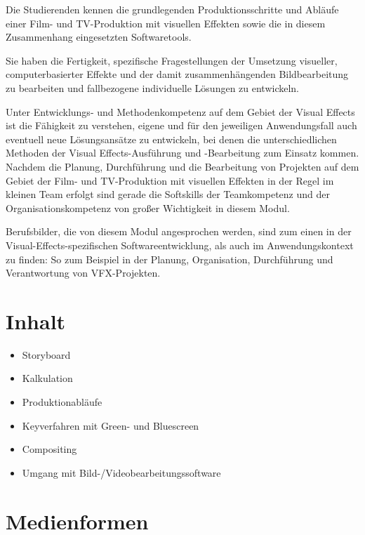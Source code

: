 Die Studierenden kennen die grundlegenden Produktionsschritte und
Abläufe einer Film- und TV-Produktion mit visuellen Effekten sowie die
in diesem Zusammenhang eingesetzten Softwaretools.

Sie haben die Fertigkeit, spezifische Fragestellungen der Umsetzung
visueller, computerbasierter Effekte und der damit zusammenhängenden
Bildbearbeitung zu bearbeiten und fallbezogene individuelle Lösungen zu
entwickeln.

Unter Entwicklungs- und Methodenkompetenz auf dem Gebiet der Visual
Effects ist die Fähigkeit zu verstehen, eigene und für den jeweiligen
Anwendungsfall auch eventuell neue Lösungsansätze zu entwickeln, bei
denen die unterschiedlichen Methoden der Visual Effects-Ausführung und
-Bearbeitung zum Einsatz kommen. Nachdem die Planung, Durchführung und
die Bearbeitung von Projekten auf dem Gebiet der Film- und TV-Produktion
mit visuellen Effekten in der Regel im kleinen Team erfolgt sind gerade
die Softskills der Teamkompetenz und der Organisationskompetenz von
großer Wichtigkeit in diesem Modul.

Berufsbilder, die von diesem Modul angesprochen werden, sind zum einen
in der Visual-Effects-spezifischen Softwareentwicklung, als auch im
Anwendungskontext zu finden: So zum Beispiel in der Planung,
Organisation, Durchführung und Verantwortung von VFX-Projekten.

\hypertarget{inhaltpathlabelmi-2017modulbeschreibungen-bachelorba_vc-visuelle-effekte-und-animation}{%
\section*{Inhalt\label{/mi-2017/modulbeschreibungen-bachelor/BA_VC-visuelle-effekte-und-animation}}\label{inhaltpathlabelmi-2017modulbeschreibungen-bachelorba_vc-visuelle-effekte-und-animation}}

\begin{itemize}
\tightlist
\item
  Storyboard
\item
  Kalkulation
\item
  Produktionabläufe
\item
  Keyverfahren mit Green- und Bluescreen
\item
  Compositing
\item
  Umgang mit Bild-/Videobearbeitungssoftware
\end{itemize}

\hypertarget{medienformenpathlabelmi-2017modulbeschreibungen-bachelorba_vc-visuelle-effekte-und-animation}{%
\section*{Medienformen\label{/mi-2017/modulbeschreibungen-bachelor/BA_VC-visuelle-effekte-und-animation}}\label{medienformenpathlabelmi-2017modulbeschreibungen-bachelorba_vc-visuelle-effekte-und-animation}}

